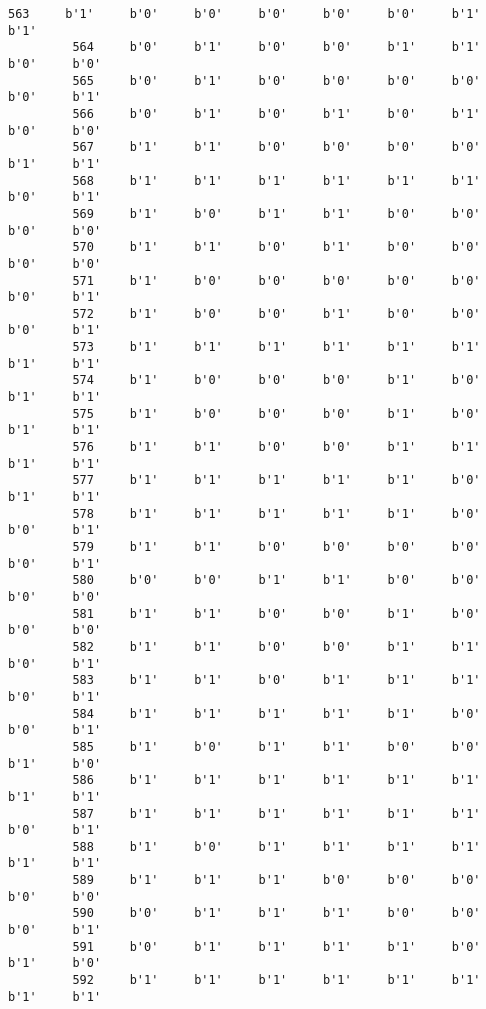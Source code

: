 \documentclass[11pt]{article}
\begin{document}
\begin{Verbatim}[commandchars=\\\{\}]
         563     b'1'     b'0'     b'0'     b'0'     b'0'     b'0'     b'1'     b'1'   
         564     b'0'     b'1'     b'0'     b'0'     b'1'     b'1'     b'0'     b'0'   
         565     b'0'     b'1'     b'0'     b'0'     b'0'     b'0'     b'0'     b'1'   
         566     b'0'     b'1'     b'0'     b'1'     b'0'     b'1'     b'0'     b'0'   
         567     b'1'     b'1'     b'0'     b'0'     b'0'     b'0'     b'1'     b'1'   
         568     b'1'     b'1'     b'1'     b'1'     b'1'     b'1'     b'0'     b'1'   
         569     b'1'     b'0'     b'1'     b'1'     b'0'     b'0'     b'0'     b'0'   
         570     b'1'     b'1'     b'0'     b'1'     b'0'     b'0'     b'0'     b'0'   
         571     b'1'     b'0'     b'0'     b'0'     b'0'     b'0'     b'0'     b'1'   
         572     b'1'     b'0'     b'0'     b'1'     b'0'     b'0'     b'0'     b'1'   
         573     b'1'     b'1'     b'1'     b'1'     b'1'     b'1'     b'1'     b'1'   
         574     b'1'     b'0'     b'0'     b'0'     b'1'     b'0'     b'1'     b'1'   
         575     b'1'     b'0'     b'0'     b'0'     b'1'     b'0'     b'1'     b'1'   
         576     b'1'     b'1'     b'0'     b'0'     b'1'     b'1'     b'1'     b'1'   
         577     b'1'     b'1'     b'1'     b'1'     b'1'     b'0'     b'1'     b'1'   
         578     b'1'     b'1'     b'1'     b'1'     b'1'     b'0'     b'0'     b'1'   
         579     b'1'     b'1'     b'0'     b'0'     b'0'     b'0'     b'0'     b'1'   
         580     b'0'     b'0'     b'1'     b'1'     b'0'     b'0'     b'0'     b'0'   
         581     b'1'     b'1'     b'0'     b'0'     b'1'     b'0'     b'0'     b'0'   
         582     b'1'     b'1'     b'0'     b'0'     b'1'     b'1'     b'0'     b'1'   
         583     b'1'     b'1'     b'0'     b'1'     b'1'     b'1'     b'0'     b'1'   
         584     b'1'     b'1'     b'1'     b'1'     b'1'     b'0'     b'0'     b'1'   
         585     b'1'     b'0'     b'1'     b'1'     b'0'     b'0'     b'1'     b'0'   
         586     b'1'     b'1'     b'1'     b'1'     b'1'     b'1'     b'1'     b'1'   
         587     b'1'     b'1'     b'1'     b'1'     b'1'     b'1'     b'0'     b'1'   
         588     b'1'     b'0'     b'1'     b'1'     b'1'     b'1'     b'1'     b'1'   
         589     b'1'     b'1'     b'1'     b'0'     b'0'     b'0'     b'0'     b'0'   
         590     b'0'     b'1'     b'1'     b'1'     b'0'     b'0'     b'0'     b'1'   
         591     b'0'     b'1'     b'1'     b'1'     b'1'     b'0'     b'1'     b'0'   
         592     b'1'     b'1'     b'1'     b'1'     b'1'     b'1'     b'1'     b'1'   

\end{Verbatim}
\end{document}
